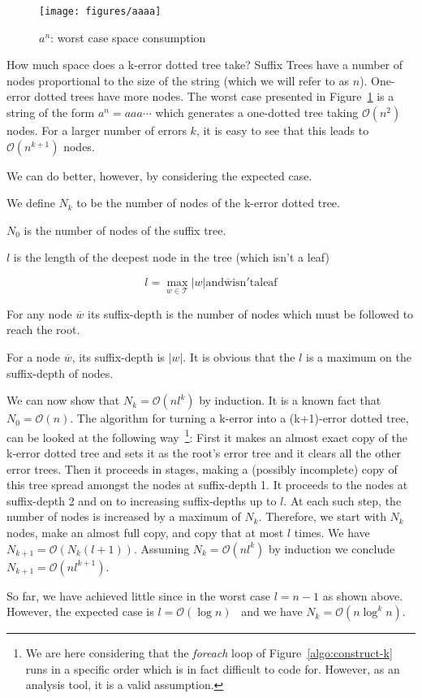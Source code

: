 \begin{figure}
\centering
\texttt{[image: figures/aaaa]}
\caption{$a^n$: worst case space consumption}%
\label{fig:aaaa}
\end{figure}

How much space does a k-error dotted tree take? Suffix Trees have a number of nodes proportional to the size of the string (which we will refer to as $n$). One-error dotted trees have more nodes. The worst case presented in Figure~\ref{fig:aaaa} is a string of the form $a^n = aaa\cdots$ which generates a one-dotted tree taking $\mathcal{O}(n^2)$ nodes. For a larger number of errors $k$, it is easy to see that this leads to $\mathcal{O}(n^{k+1})$ nodes.

We can do better, however, by considering the expected case.

\begin{definition}
We define $N_k$ to be the number of nodes of the k-error dotted tree.

$N_0$ is the number of nodes of the suffix tree.
\end{definition}

\begin{definition}
$l$ is the length of the deepest node in the tree (which isn't a leaf)

\[ l = \max_{\overline{w} \in \mathcal{T}} |w| \mathrm{and \overline{w} isn't a leaf} \]
\end{definition}

\begin{definition}
For any node $\overline{w}$ its suffix-depth is the number of nodes which must be followed to reach the root.
\end{definition}

For a node $\overline{w}$, its suffix-depth is $|w|$. It is obvious that the $l$ is a maximum on the suffix-depth of nodes.

We can now show that $N_k = \mathcal{O}(nl^k)$ by induction. It is a known fact that $N_0 = \mathcal{O}(n)$. The algorithm for turning a k-error into a (k+1)-error dotted tree, can be looked at the following way~\footnote{We are here considering that the \textit{foreach} loop of Figure~\ref{algo:construct-k} runs in a specific order which is in fact difficult to code for. However, as an analysis tool, it is a valid assumption.}: First it makes an almost exact copy of the k-error dotted tree and sets it as the root's error tree and it clears all the other error trees. Then it proceeds in stages, making a (possibly incomplete) copy of this tree spread amongst the nodes at suffix-depth 1. It proceeds to the nodes at suffix-depth 2 and on to increasing suffix-depths up to $l$. At each such step, the number of nodes is increased by a maximum of $N_k$. Therefore, we start with $N_k$ nodes, make an almost full copy, and copy that at most $l$ times. We have $N_{k+1}=\mathcal{O}(N_k(l+1))$. Assuming $N_k=\mathcal{O}(nl^k)$ by induction we conclude $N_{k+1}=\mathcal{O}(nl^{k+1})$.

So far, we have achieved little since in the worst case $l=n-1$ as shown above. However, the expected case is $l=\mathcal{O}(\log n)$~\cite{apostolico92selfalignments} and we have $N_k=\mathcal{O}(n\log^k n)$.

